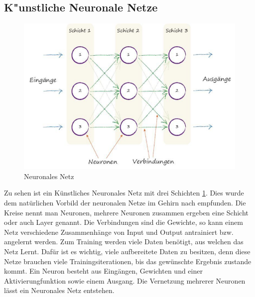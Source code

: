 \subsection{K"unstliche Neuronale Netze}
\begin{figure}[htb]
  \centering  
  \includegraphics[scale=0.5]{img/S36_Buildyourown.png}
  \caption{Neuronales Netz   \cite{rashid2017neuronale}}
  \label{fig:neural_network}
\end{figure}

Zu sehen ist ein Künstliches Neuronales Netz mit drei Schichten \ref{fig:neural_network}. Dies wurde dem natürlichen Vorbild der neuronalen Netze im Gehirn nach empfunden. Die Kreise nennt man Neuronen, mehrere Neuronen zusammen ergeben eine Schicht oder auch Layer genannt. Die Verbindungen sind die Gewichte, so kann einem Netz verschiedene Zusammenhänge von Input und Output antrainiert bzw. angelernt werden. Zum Training werden viele Daten benötigt, aus welchen das Netz \glqq Lernt\grqq{}. Dafür ist es wichtig, viele aufbereitete Daten zu besitzen, denn diese Netze brauchen viele Trainingsiterationen, bis das gewünschte Ergebnis zustande kommt. Ein Neuron besteht aus Eingängen, Gewichten und einer Aktivierungfunktion sowie einem Ausgang. Die Vernetzung mehrerer Neuronen lässt ein Neuronales Netz entstehen.

\newpage
